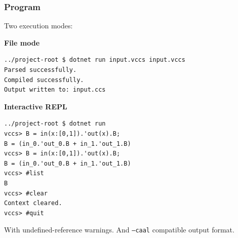 \documentclass[t]{beamer}
\begin{document}

\begin{frame}[fragile]
  \frametitle{Program}

  Two execution modes:

  \vspace{0.3cm}

  \textbf{File mode}
  \begin{lstlisting}[language={}, basicstyle=\ttfamily\tiny]
../project-root $ dotnet run input.vccs input.vccs
Parsed successfully.
Compiled successfully.
Output written to: input.ccs
  \end{lstlisting}

  \vspace{0.3cm}

  \textbf{Interactive REPL}
  \begin{lstlisting}[language={}, basicstyle=\ttfamily\tiny]
../project-root $ dotnet run 
vccs> B = in(x:[0,1]).'out(x).B;
B = (in_0.'out_0.B + in_1.'out_1.B)
vccs> B = in(x:[0,1]).'out(x).B;
B = (in_0.'out_0.B + in_1.'out_1.B)
vccs> #list
B
vccs> #clear
Context cleared.
vccs> #quit
  \end{lstlisting}

  \vspace{0.2cm}
  \small With undefined-reference warnings. And \texttt{--caal} compatible output format.

\end{frame}

\end{document}
